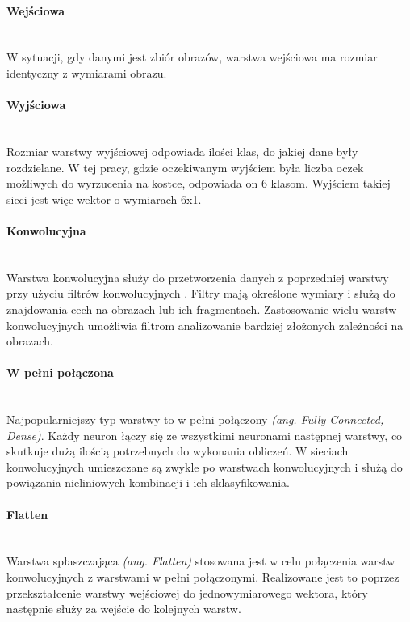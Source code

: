 \paragraph{Wejściowa} \mbox{}\\
W sytuacji, gdy danymi jest zbiór obrazów, warstwa wejściowa ma rozmiar identyczny z
wymiarami obrazu.

\paragraph{Wyjściowa} \mbox{}\\
Rozmiar warstwy wyjściowej odpowiada ilości klas, do jakiej dane były rozdzielane.
W tej pracy, gdzie oczekiwanym wyjściem była liczba oczek możliwych do wyrzucenia na
kostce, odpowiada on 6 klasom. Wyjściem takiej sieci jest więc wektor o wymiarach 6x1.

\paragraph{Konwolucyjna} \mbox{}\\
Warstwa konwolucyjna służy do przetworzenia danych z poprzedniej warstwy przy użyciu
filtrów konwolucyjnych \cite{CS231n}. Filtry mają określone wymiary i służą do znajdowania cech
na obrazach lub ich fragmentach. Zastosowanie wielu warstw konwolucyjnych umożliwia filtrom
analizowanie bardziej złożonych zależności na obrazach.

\paragraph{W pełni połączona} \mbox{}\\
Najpopularniejszy typ warstwy to w pełni połączony \textit{(ang. Fully Connected, Dense)}.
Każdy neuron łączy się ze wszystkimi neuronami następnej warstwy, co skutkuje dużą ilością
potrzebnych do wykonania obliczeń.
W sieciach konwolucyjnych umieszczane są zwykle po warstwach konwolucyjnych
i służą do powiązania nieliniowych kombinacji i ich sklasyfikowania.

\paragraph{Flatten} \mbox{}\\
Warstwa spłaszczająca \textit{(ang. Flatten)} stosowana jest w celu połączenia warstw
konwolucyjnych z warstwami w pełni połączonymi. Realizowane jest to poprzez przekształcenie
warstwy wejściowej do jednowymiarowego wektora, który następnie służy za wejście
do kolejnych warstw.

